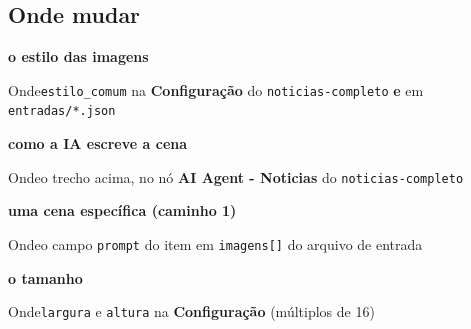 \subsection*{Onde mudar}

\begin{recordbox}
{\bfseries\color{accent} o estilo das imagens}\par
{\small\color{muted} Onde}\quad \nolinkurl{estilo_comum} na \textbf{Configuração} do \nolinkurl{noticias-completo} \textbf{e} em \nolinkurl{entradas/*.json}\par
\end{recordbox}
\begin{recordbox}
{\bfseries\color{accent} como a IA escreve a cena}\par
{\small\color{muted} Onde}\quad o trecho acima, no nó \textbf{AI Agent - Noticias} do \nolinkurl{noticias-completo}\par
\end{recordbox}
\begin{recordbox}
{\bfseries\color{accent} uma cena específica (caminho 1)}\par
{\small\color{muted} Onde}\quad o campo \texttt{prompt} do item em \texttt{imagens[]} do arquivo de entrada\par
\end{recordbox}
\begin{recordbox}
{\bfseries\color{accent} o tamanho}\par
{\small\color{muted} Onde}\quad \texttt{largura} e \texttt{altura} na \textbf{Configuração} (múltiplos de 16)\par
\end{recordbox}
